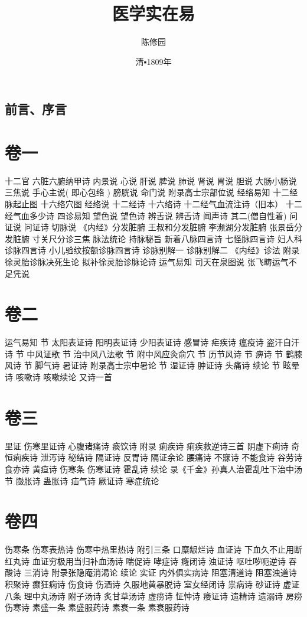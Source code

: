 \documentclass[a4paper,12pt,UTF8,twoside]{ctexbook}
\title{\heiti\zihao{0} 医学实在易}
\author{陈修园}
\date{清▪1809年}
\begin{document}
\maketitle
\tableofcontents

\frontmatter
\chapter{前言、序言}

\mainmatter
\part{卷一}

十二官
六脏六腑纳甲诗
内景说
心说
肝说
脾说
肺说
肾说
胃说
胆说
大肠小肠说
三焦说
手心主说( 即心包络 )
膀胱说
命门说
附录高士宗部位说
经络易知
十二经脉起止图
十六络穴图
经络说
十二经诗
十六络诗
十二经气血流注诗（旧本）
十二经气血多少诗
四诊易知
望色说
望色诗
辨舌说
辨舌诗
闻声诗
其二(僧自性着) 
问证说
问证诗
切脉说
《内经》分发脏腑
王叔和分发脏腑
李濒湖分发脏腑
张景岳分发脏腑
寸关尺分诊三焦
脉法统论
持脉秘旨
新着八脉四言诗
七怪脉四言诗
妇人科诊脉四言诗
小儿验纹按额诊脉四言诗
诊脉别解一
诊脉别解二
《内经》诊法
附录徐灵胎诊脉决死生论
拟补徐灵胎诊脉论诗
运气易知
司天在泉图说
张飞畴运气不足凭说

\part{卷二}
运气易知 节
太阳表证诗
阳明表证诗
少阳表证诗
感冒诗
疟疾诗
瘟疫诗
盗汗自汗诗 节
中风证歌 节
治中风八法歌 节
附中风应灸俞穴 节
历节风诗 节
痹诗 节
鹤膝风诗 节
脚气诗
暑证诗
附录高士宗中暑论 节
湿证诗
肿证诗
头痛诗
续论 节
眩晕诗
咳嗽诗
咳嗽续论
又诗一首
\part{卷三}
里证
伤寒里证诗
心腹诸痛诗
痰饮诗
附录
痢疾诗
痢疾救逆诗三首
阴虚下痢诗
奇恒痢疾诗
泄泻诗
秘结诗
隔证诗
反胃诗
隔证余论
腰痛诗
不寐诗
不能食诗
谷劳诗
食亦诗
黄疸诗
伤寒条
伤寒证诗
霍乱诗
续论
录《千金》孙真人治霍乱吐下治中汤 节
臌胀诗
蛊胀诗
疝气诗
厥证诗
寒症统论
\part{卷四}
伤寒条
伤寒表热诗
伤寒中热里热诗
附引三条
口糜龈烂诗
血证诗
下血久不止用断红丸诗
血证穷极用当归补血汤诗
喘促诗
哮症诗
癃闭诗
浊证诗
呕吐哕呃逆诗
吞酸诗
三消诗
附录张隐庵消渴论
续论
实证
内外俱实病诗
阻塞清道诗
阻塞浊道诗
积聚诗
癫狂痫诗
伤食诗
伤酒诗
久服地黄暴脱诗
室女经闭诗
祟病诗
砂证诗
虚证八条
理中丸汤诗
附子汤诗 
炙甘草汤诗
虚痨诗
怔忡诗
痿证诗
遗精诗
遗溺诗
房痨伤寒诗
素盛一条 
素盛服药诗
素衰一条 
素衰服药诗
\end{document}
